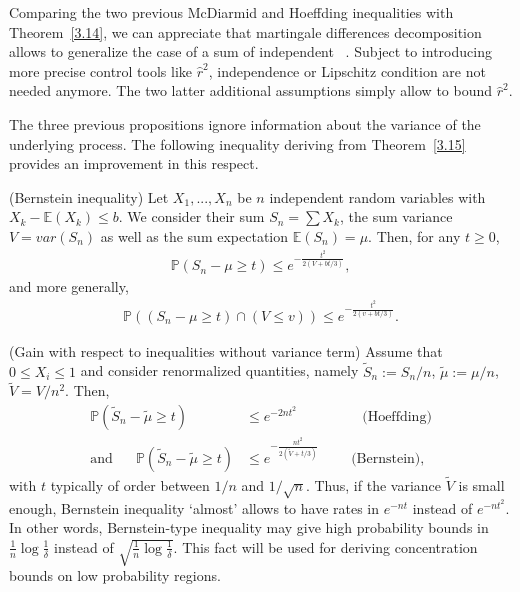 \begin{remark}
Comparing the two previous McDiarmid and Hoeffding inequalities with Theorem~\ref{3.14}, we can appreciate that martingale differences decomposition allows to generalize the case of a sum of independent \rv~.
Subject to introducing more precise control tools like  $\hat r^2$, independence or Lipschitz condition are not needed anymore.
The two latter additional assumptions simply allow to bound $\hat r^2$.
\end{remark}

The three previous propositions ignore information about the variance of the underlying process. The following inequality deriving from Theorem~\ref{3.15} provides an improvement in this respect.

\begin{proposition} ({\sc Bernstein inequality})
\label{Bernstein}
Let $X_1,...,X_n$ be $n$ independent random variables with $X_k-\mathbb{E}(X_k) \leq b$. We consider their sum $S_n=\sum X_k$, the sum variance $V=var(S_n)$ as well as the sum expectation $\mathbb{E}(S_n)=\mu$. Then, for any $t \ge 0$,
\begin{align*}
\mathbb{P}(S_n-\mu \geq t) \leq e^{-\frac{t^2}{2(V+bt/3)}},
\end{align*} 
and more generally,
\begin{align*}
\mathbb{P}((S_n-\mu \geq t)\cap(V \leq v)) \leq e^{-\frac{t^2}{2(v+bt/3)}}.
\end{align*} 
\end{proposition}

\begin{remark}({\sc Gain with respect to inequalities without variance term})
Assume that $0 \le X_i \le 1$ and consider renormalized quantities, namely $\tilde S_n := S_n/n$, $\tilde \mu:= \mu/n$, $\tilde V = V/n^2$. Then,
\begin{align*}
\mathbb{P}(\tilde S_n-\tilde \mu \geq t) &\leq e^{-2nt^2} \text{~~~~~~~~~~~~~~(Hoeffding)}\\
\text{and~~~~~}\mathbb{P}(\tilde S_n-\tilde \mu \ge t) &\leq e^{-\frac{n t^2}{2(\tilde V+t/3)}} \text{~~~~~~~(Bernstein)},
\end{align*}
with $t$ typically of order between $1/n$ and $1/\sqrt n$. Thus, if the variance $\tilde V$ is small enough, Bernstein inequality `almost' allows to have rates in $e^{-nt}$ instead of $e^{-nt^2}$. In other words, Bernstein-type inequality may give high probability bounds in $\frac{1}{n}\log{\frac{1}{\delta}}$ instead of $\sqrt{\frac{1}{n}\log{\frac{1}{\delta}}}$. This fact will be used for deriving concentration bounds on low probability regions.%
\end{remark}

